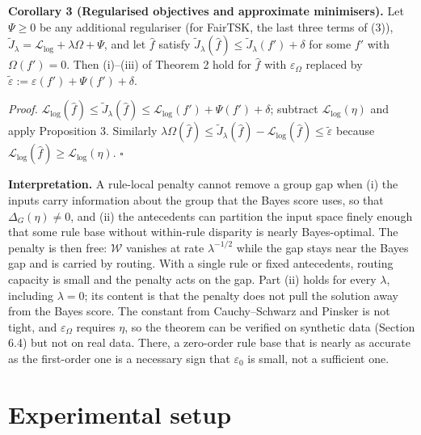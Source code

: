 \documentclass[pdflatex,sn-basic,Numbered,lineno]{sn-jnl}
\begin{document}
\textbf{Corollary 3 (Regularised objectives and approximate minimisers).} Let \(\Psi \geq 0\) be any additional regulariser (for FairTSK, the last three terms of (3)), \(\tilde J_\lambda = \mathcal{L}_{\log} + \lambda\Omega + \Psi\), and let \(\hat f\) satisfy \(\tilde J_\lambda(\hat f) \leq \tilde J_\lambda(f') + \delta\) for some \(f'\) with \(\Omega(f') = 0\). Then (i)--(iii) of Theorem 2 hold for \(\hat f\) with \(\varepsilon_\Omega\) replaced by \(\tilde\varepsilon := \varepsilon(f') + \Psi(f') + \delta\).

\emph{Proof.} \(\mathcal{L}_{\log}(\hat f) \leq \tilde J_\lambda(\hat f) \leq \mathcal{L}_{\log}(f') + \Psi(f') + \delta\); subtract \(\mathcal{L}_{\log}(\eta)\) and apply Proposition 3. Similarly \(\lambda\Omega(\hat f) \leq \tilde J_\lambda(\hat f) - \mathcal{L}_{\log}(\hat f) \leq \tilde\varepsilon\) because \(\mathcal{L}_{\log}(\hat f) \geq \mathcal{L}_{\log}(\eta)\). \(\square\)

\textbf{Interpretation.} A rule-local penalty cannot remove a group gap when (i) the inputs carry information about the group that the Bayes score uses, so that \(\Delta_{G}(\eta) \neq 0\), and (ii) the antecedents can partition the input space finely enough that some rule base without within-rule disparity is nearly Bayes-optimal. The penalty is then free: \(\mathcal W\) vanishes at rate \(\lambda^{-1/2}\) while the gap stays near the Bayes gap and is carried by routing. With a single rule or fixed antecedents, routing capacity is small and the penalty acts on the gap. Part (ii) holds for every \(\lambda\), including \(\lambda = 0\); its content is that the penalty does not pull the solution away from the Bayes score. The constant from Cauchy--Schwarz and Pinsker is not tight, and \(\varepsilon_\Omega\) requires \(\eta\), so the theorem can be verified on synthetic data (Section 6.4) but not on real data. There, a zero-order rule base that is nearly as accurate as the first-order one is a necessary sign that \(\varepsilon_0\) is small, not a sufficient one.

\hypertarget{experimental-setup}{%
\section{Experimental setup}\label{experimental-setup}}
\end{document}
